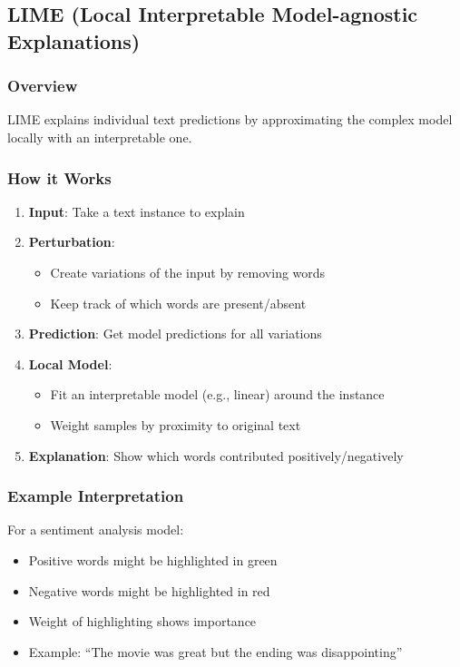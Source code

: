 \documentclass{article}
\begin{document}
\subsection{LIME (Local Interpretable Model-agnostic Explanations)}

\subsubsection{Overview}
LIME explains individual text predictions by approximating the complex model locally with an interpretable one.

\subsubsection{How it Works}
\begin{enumerate}
    \item \textbf{Input}: Take a text instance to explain
    \item \textbf{Perturbation}: 
        \begin{itemize}
            \item Create variations of the input by removing words
            \item Keep track of which words are present/absent
        \end{itemize}
    \item \textbf{Prediction}: Get model predictions for all variations
    \item \textbf{Local Model}: 
        \begin{itemize}
            \item Fit an interpretable model (e.g., linear) around the instance
            \item Weight samples by proximity to original text
        \end{itemize}
    \item \textbf{Explanation}: Show which words contributed positively/negatively
\end{enumerate}

\subsubsection{Example Interpretation}
For a sentiment analysis model:
\begin{itemize}
    \item Positive words might be highlighted in green
    \item Negative words might be highlighted in red
    \item Weight of highlighting shows importance
    \item Example: ``The movie was {\color{green}great} but the ending was {\color{red}disappointing}''
\end{itemize}
\end{document}
